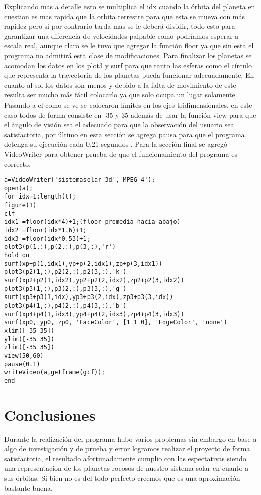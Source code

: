 \documentclass[12pt]{article}
\begin{document}
Explicando mas a detalle esto se multiplica el idx cuando la órbita del planeta en cuestion es mas rapida que la orbita terrestre para que esta se mueva con más rapidez pero si por contrario tarda mas se le deberá dividir, todo esto para garantizar una diferencia de velocidades palpable como podríamos esperar a escala real, aunque claro se le tuvo que agregar la función floor ya que sin esta el programa no admitirá esta clase de modificaciones.
Para finalizar los planetas se acomodan los datos en los plot3 y surf para que tanto las esferas como el círculo que representa la trayectoria de los planetas pueda funcionar adecuadamente.
En cuanto al sol los datos son menos y debido a la falta de movimiento de este resulta ser mucho más fácil colocarlo ya que solo ocupa un lugar solamente.
Pasando a el como se ve se colocaron límites en los ejes tridimensionales, en este caso todos de forma consiste en -35 y 35 además de usar la función view para que el ángulo de visión sea el adecuado para que la observación del usuario sea satisfactoria, por último en esta sección se agrega pausa para que el programa detenga su ejecución cada 0.21 segundos .
Para la sección final se agregó VideoWriter para obtener prueba de que el funcionamiento del programa es correcto.
\begin{lstlisting}
a=VideoWriter('sistemasolar_3d','MPEG-4');
open(a);
for idx=1:length(t);
figure(1)
clf
idx1 =floor(idx*4)+1;(floor promedia hacia abajo)
idx2 =floor(idx*1.6)+1;
idx3 =floor(idx*0.53)+1;
plot3(p(1,:),p(2,:),p(3,:),'r')
hold on
surf(xp+p(1,idx1),yp+p(2,idx1),zp+p(3,idx1))
plot3(p2(1,:),p2(2,:),p2(3,:),'k')
surf(xp2+p2(1,idx2),yp2+p2(2,idx2),zp2+p2(3,idx2))
plot3(p3(1,:),p3(2,:),p3(3,:),'g')
surf(xp3+p3(1,idx),yp3+p3(2,idx),zp3+p3(3,idx))
plot3(p4(1,:),p4(2,:),p4(3,:),'b')
surf(xp4+p4(1,idx3),yp4+p4(2,idx3),zp4+p4(3,idx3))
surf(xp0, yp0, zp0, 'FaceColor', [1 1 0], 'EdgeColor', 'none')
xlim([-35 35])
ylim([-35 35])
zlim([-35 35])
view(50,60)
pause(0.1)
writeVideo(a,getframe(gcf));
end
\end{lstlisting}
	\section{Conclusiones}
	Durante la realización del programa hubo varios problemas sin embargo en base a algo de investigación y de prueba y error logramos realizar el proyecto de forma satisfactoria, el resultado afortunadamente cumplio con las espectativas siendo una representacion de los planetas rocosos de nuestro sistema solar en cuanto a sus órbitas. Si bien no es del todo perfecto creemos que es una aproximación bastante buena.
	
\end{document}
